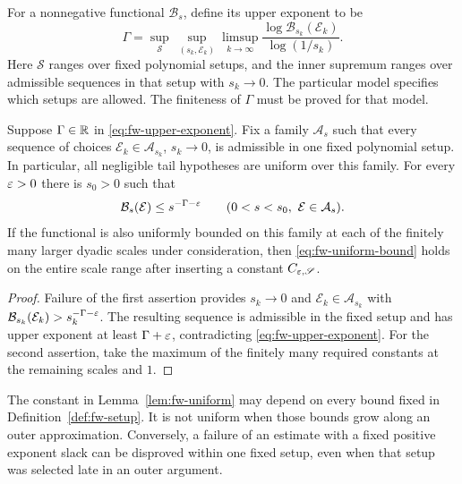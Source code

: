 For a nonnegative functional $\mathcal B_s$, define its upper exponent
to be
\begin{equation}\label{eq:fw-upper-exponent}
 \Gamma=\sup_{\mathscr S}\ \sup_{(s_k,\mathcal E_k)}
 \limsup_{k\to\infty}
 \frac{\log\mathcal B_{s_k}(\mathcal E_k)}{\log(1/s_k)}.
\end{equation}
Here $\mathscr S$ ranges over fixed polynomial setups, and the inner
supremum ranges over admissible sequences in that setup with $s_k\to0$.
The particular model specifies which setups are allowed.  The finiteness
of $\Gamma$ must be proved for that model.

\begin{lemma}
\label{lem:fw-uniform}
Suppose $\Gamma\in\mathbb R$ in \eqref{eq:fw-upper-exponent}.  Fix a family
$\mathcal A_s$ such that every sequence of choices
$\mathcal E_k\in\mathcal A_{s_k}$, $s_k\to0$, is admissible in one fixed
polynomial setup.  In particular, all negligible tail hypotheses are
uniform over this family.  For every $\varepsilon>0$ there is $s_0>0$ such that
\begin{equation}\label{eq:fw-uniform-bound}
 \mathcal B_s(\mathcal E)\le s^{-\Gamma-\varepsilon}
 \qquad(0<s<s_0,\ \mathcal E\in\mathcal A_s).
\end{equation}
If the functional is also uniformly bounded on this family at each of
the finitely many larger dyadic scales under consideration, then
\eqref{eq:fw-uniform-bound} holds on the entire scale range after
inserting a constant $C_{\varepsilon,\mathscr S}$.
\end{lemma}

\begin{proof}
Failure of the first assertion provides $s_k\to0$ and
$\mathcal E_k\in\mathcal A_{s_k}$ with
$\mathcal B_{s_k}(\mathcal E_k)>s_k^{-\Gamma-\varepsilon}$.
The resulting sequence is admissible in the fixed setup and has upper
exponent at least $\Gamma+\varepsilon$, contradicting
\eqref{eq:fw-upper-exponent}.  For the second assertion, take the
maximum of the finitely many required constants at the remaining
scales and $1$.
\end{proof}

The constant in Lemma~\ref{lem:fw-uniform} may depend on every bound
fixed in Definition~\ref{def:fw-setup}.  It is not uniform when those
bounds grow along an outer approximation.  Conversely, a failure of an
estimate with a fixed positive exponent slack can be disproved within
one fixed setup, even when that setup was selected late in an outer
argument.

